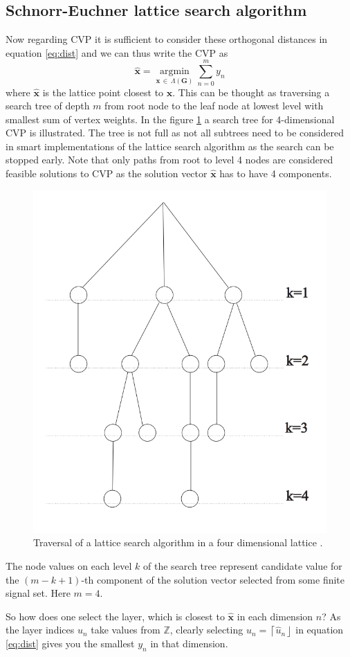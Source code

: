\documentclass[english,12pt,a4paper,pdftex,sci,utf8]{aaltothesis}
\begin{document}
\subsection{Schnorr-Euchner lattice search algorithm}
Now regarding CVP it is sufficient to consider these orthogonal distances in equation \eqref{eq:dist} and we can thus write the CVP as
\begin{equation}
\mathbf{\hat{x}} = 
\underset{\mathbf{x}\,\in\,\Lambda(\mathbf{G})}{\operatorname{argmin}} 
\sum_{n = 0}^{m} y_n
\label{eq:cvp}
\end{equation}
where $\mathbf{\hat{x}}$ is the lattice point closest to $\mathbf{x}$. This can be thought as traversing a search tree of depth $m$ from root node to the leaf node at lowest level with smallest sum of vertex weights. In the figure \ref{fig:tree} a search tree for 4-dimensional CVP is illustrated. The tree is not full as not all subtrees need to be considered in smart implementations of the lattice search algorithm as the search can be stopped early. Note that only paths from root to level 4 nodes are considered feasible solutions to CVP as the solution vector $\mathbf{\hat{x}}$ has to have 4 components.
\begin{figure}[ht] 
  \centering
  \includegraphics[width=0.5\linewidth]{search-tree}
  \caption{Traversal of a lattice search algorithm in a four dimensional lattice \cite{mia}.}
  \label{fig:tree}
\end{figure}
The node values on each level $k$ of the search tree represent candidate value for the $(m-k+1)$-th component of the solution vector selected from some finite signal set. Here $m = 4$.
\par So how does one select the layer, which is closest to $\mathbf{\hat{x}}$ in each dimension $n$? As the layer indices $u_n$ take values from $\mathbb{Z}$, clearly selecting $u_n = \left\lceil\hat{u}_n\right\rfloor$ in equation \eqref{eq:dist} gives you the smallest $y_n$ in that dimension. 
\end{document}
